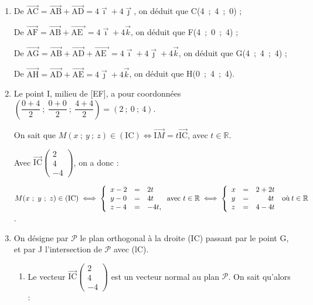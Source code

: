\documentclass[10pt]{article}
\providecommand{\R}{\mathbb{R}}
\providecommand{\vect}[1]{\overrightarrow{#1}}
\begin{document}
\begin{enumerate}
\item 
De $\vect{\text{AC}} = \vect{\text{AB}} + \vect{\text{AD}} = 4\vect{\imath} + 4\vect{\jmath}$, on déduit que C(4~;~4~;~0) ;

De $\vect{\text{AF}} = \vect{\text{AB}} + \vect{\text{AE }} = 4\vect{\imath} + 4\vect{k}$, on déduit que F(4~;~0~;~4) ;

De $\vect{\text{AG}} = \vect{\text{AB}} +  \vect{\text{AD}} + \vect{\text{AE }} = 4\vect{\imath}+ 4\vect{\jmath} + 4\vect{k}$, on déduit que G(4~;~4~;~4) ;

De $\vect{\text{AH}} = \vect{\text{AD}} +  \vect{\text{AE}} = 4\vect{\jmath}+ 4\vect{k}$, on déduit que H(0~;~4~;~4).

\item 


Le point I, milieu de [EF], a pour coordonnées $\left(\dfrac{0 + 4}{2}~;~\dfrac{0 + 0}{2}~;~\dfrac{4 + 4}{2} \right) = (2~;~0~;~4)$.

On sait que $M(x~;~y~;~z) \in (\text{IC}) \iff \vect{\text{I}M} = t \vect{\text{IC}}$, avec $t \in \R$.

Avec $\vect{\text{IC}}\begin{pmatrix}2\\4\\-4\end{pmatrix}$, on a donc :

$M(x~;~y~;~z) \in (\text{IC}) \iff \left\{\begin{array}{l c l}
x - 2&=&2t\\
y - 0&=&4t\\
z - 4&=&-4t,
\end{array}\right.
 \text{avec } t \in \R \iff
\left\{\begin{array}{l c l}
x &=&2+2t\\
y &=&\phantom{2 +~}4t\\
z &=&4 - 4t
\end{array}\right.\:\text{où} \: t \in \R$.

\item On désigne par $\mathcal{P}$ le plan orthogonal à la droite (IC) passant par le point G, et par J l'intersection de $\mathcal{P}$ avec (lC).

	\begin{enumerate}
		\item 
Le vecteur $\vect{\text{IC}}\begin{pmatrix}2\\4\\-4\end{pmatrix}$ est un vecteur normal au plan $\mathcal{P}$. On sait qu'alors :
		

\end{enumerate}
\end{enumerate}
\end{document}
